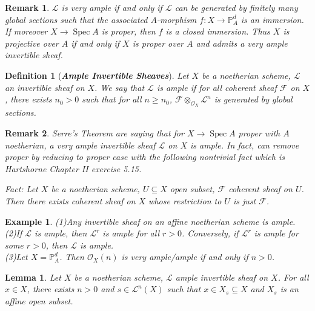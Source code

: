 \documentclass{ctexart}
\newtheorem{definition}{Definition}[section]
\newtheorem{remark}{Remark}[section]
\newtheorem{lemma}{Lemma}[section]
\newtheorem{example}{Example}[section]
\newcommand{\spec}{\operatorname{Spec}}
\begin{document}
\begin{remark}
    $\mathcal{L}$ is very ample if and only if $\mathcal{L}$ can be generated by finitely many global sections such that the associated $A$-morphism $f: X \longrightarrow \mathbb{P}_{A}^{d}$ is an immersion.
    If moreover $X \longrightarrow \spec A$ is proper, then $f$ is a closed immersion.
    Thus $X$ is projective over $A$ if and only if $X$ is proper over $A$ and admits a very ample invertible sheaf.
\end{remark}
\begin{definition}[\textbf{\emph{Ample Invertible Sheaves}}]
    Let $X$ be a noetherian scheme, $\mathcal{L}$ an invertible sheaf on $X$.
    We say that $\mathcal{L}$ is ample if for all coherent sheaf $\mathcal{F}$ on $X$,
    there exists $n_{0} > 0$ such that for all $n \ge n_{0}$, $\mathcal{F} \otimes_{\mathcal{O}_{X}} \mathcal{L}^{n}$ is generated by global sections.
\end{definition}
\begin{remark}
    Serre's Theorem are saying that for $X \longrightarrow \spec A$ proper with $A$ noetherian,
    a very ample invertible sheaf $\mathcal{L}$ on $X$ is ample.
    In fact, can remove proper by reducing to proper case with the following nontrivial fact which is Hartshorne Chapter II exercise 5.15.
    \par
    Fact: Let $X$ be a noetherian scheme, $U \subseteq X$ open subset, $\mathcal{F}$ coherent sheaf on $U$.
    Then there exists coherent sheaf on $X$ whose restriction to $U$ is just $\mathcal{F}$.
\end{remark}
\begin{example}
    (1)Any invertible sheaf on an affine noetherian scheme is ample. \\
    (2)If $\mathcal{L}$ is ample, then $\mathcal{L}^{r}$ is ample for all $r > 0$. 
    Conversely, if $\mathcal{L}^{r}$ is ample for some $r > 0$, then $\mathcal{L}$ is ample. \\
    (3)Let $X = \mathbb{P}_{A}^{d}$.
    Then $\mathcal{O}_{X}(n)$ is very ample/ample if and only if $n > 0$.
\end{example}
\begin{lemma}
    Let $X$ be a noetherian scheme, $\mathcal{L}$ ample invertible sheaf on $X$.
    For all $x\in X$, there exists $n > 0$ and $s\in \mathcal{L}^{n}(X)$ such that $x\in X_{s} \subseteq X$ and $X_{s}$ is an affine open subset.
    \label{Lemma 4.1}
\end{lemma}
\end{document}
